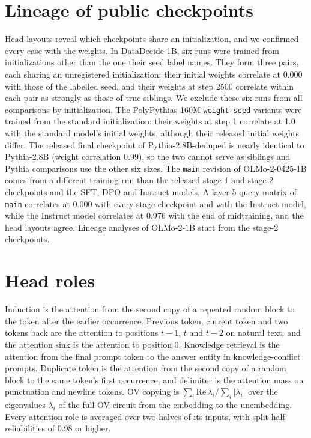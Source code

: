 \documentclass[11pt]{article}
\begin{document}


\appendix

\section{Lineage of public checkpoints}
\label{app:audit}
Head layouts reveal which checkpoints share an initialization, and we confirmed every case with the weights.
In DataDecide-1B, six runs were trained from initializations other than the one their seed label names.
They form three pairs, each sharing an unregistered initialization: their initial weights correlate at 0.000 with those of the labelled seed, and their weights at step 2500 correlate within each pair as strongly as those of true siblings.
We exclude these six runs from all comparisons by initialization.
The PolyPythias 160M \texttt{weight-seed} variants were trained from the standard initialization: their weights at step 1 correlate at 1.0 with the standard model's initial weights, although their released initial weights differ.
The released final checkpoint of Pythia-2.8B-deduped is nearly identical to Pythia-2.8B (weight correlation 0.99), so the two cannot serve as siblings and Pythia comparisons use the other six sizes.
The \texttt{main} revision of OLMo-2-0425-1B comes from a different training run than the released stage-1 and stage-2 checkpoints and the SFT, DPO and Instruct models.
A layer-5 query matrix of \texttt{main} correlates at 0.000 with every stage checkpoint and with the Instruct model, while the Instruct model correlates at 0.976 with the end of midtraining, and the head layouts agree.
Lineage analyses of OLMo-2-1B start from the stage-2 checkpoints.

\section{Head roles}
\label{app:roles}
Induction is the attention from the second copy of a repeated random block to the token after the earlier occurrence.
Previous token, current token and two tokens back are the attention to positions $t-1$, $t$ and $t-2$ on natural text, and the attention sink is the attention to position 0.
Knowledge retrieval is the attention from the final prompt token to the answer entity in knowledge-conflict prompts.
Duplicate token is the attention from the second copy of a random block to the same token's first occurrence, and delimiter is the attention mass on punctuation and newline tokens.
OV copying is $\sum_i \mathrm{Re}\,\lambda_i / \sum_i |\lambda_i|$ over the eigenvalues $\lambda_i$ of the full OV circuit from the embedding to the unembedding.
Every attention role is averaged over two halves of its inputs, with split-half reliabilities of 0.98 or higher.
\end{document}
